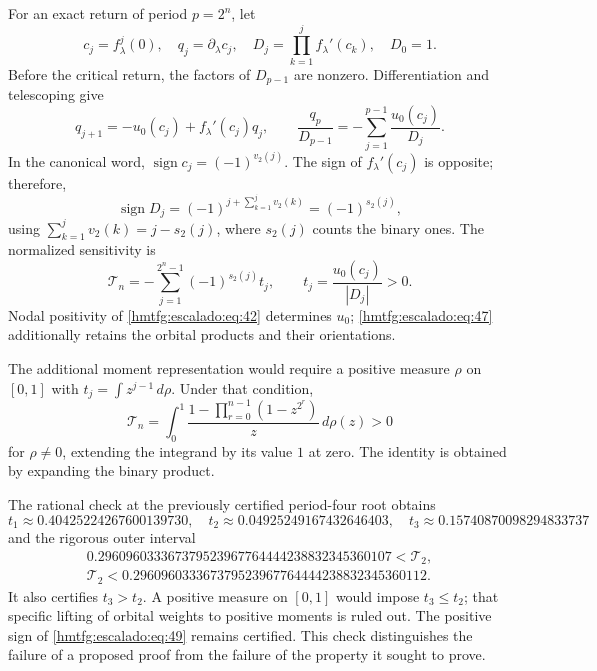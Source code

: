 For an exact return of period \(p=2^n\), let
\[
c_j=f_\lambda^j(0),\quad q_j=\partial_\lambda c_j,\quad
D_j=\prod_{k=1}^j f_\lambda'(c_k),\quad D_0=1.
\]
Before the critical return, the factors of \(D_{p-1}\) are nonzero. Differentiation and telescoping give
\begin{equation}
q_{j+1}=-u_0(c_j)+f_\lambda'(c_j)q_j,\qquad
\boxed{\frac{q_p}{D_{p-1}}
=-\sum_{j=1}^{p-1}\frac{u_0(c_j)}{D_j}.}
\label{hmtfg:escalado:eq:45}
\end{equation}
In the canonical word, \(\operatorname{sign}c_j=(-1)^{v_2(j)}\). The sign of \(f_\lambda'(c_j)\) is opposite; therefore,
\begin{equation}
\operatorname{sign}D_j=(-1)^{j+\sum_{k=1}^jv_2(k)}
=(-1)^{s_2(j)},
\label{hmtfg:escalado:eq:46}
\end{equation}
using \(\sum_{k=1}^jv_2(k)=j-s_2(j)\), where \(s_2(j)\) counts the binary ones. The normalized sensitivity is
\begin{equation}
\mathcal T_n=-\sum_{j=1}^{2^n-1}(-1)^{s_2(j)}t_j,\qquad
t_j=\frac{u_0(c_j)}{|D_j|}>0.
\label{hmtfg:escalado:eq:47}
\end{equation}
Nodal positivity of \eqref{hmtfg:escalado:eq:42} determines \(u_0\); \eqref{hmtfg:escalado:eq:47} additionally retains the orbital products and their orientations.

The additional moment representation would require a positive measure \(\rho\) on \([0,1]\) with \(t_j=\int z^{j-1}\,d\rho\). Under that condition,
\begin{equation}
\mathcal T_n=\int_0^1
\frac{1-\prod_{r=0}^{n-1}(1-z^{2^r})}{z}\,d\rho(z)>0
\label{hmtfg:escalado:eq:48}
\end{equation}
for \(\rho\ne0\), extending the integrand by its value \(1\) at zero. The identity is obtained by expanding the binary product.

The rational check at the previously certified period-four root obtains
\[
t_1\approx0.40425224267600139730,\quad
t_2\approx0.04925249167432646403,\quad
t_3\approx0.15740870098294833737
\]
and the rigorous outer interval
\begin{equation}
\begin{gathered}
0.296096033367379523967764444238832345360107<\mathcal T_2,\\
\mathcal T_2<0.296096033367379523967764444238832345360112.
\end{gathered}
\label{hmtfg:escalado:eq:49}
\end{equation}
It also certifies \(t_3>t_2\). A positive measure on \([0,1]\) would impose \(t_3\le t_2\); that specific lifting of orbital weights to positive moments is ruled out. The positive sign of \eqref{hmtfg:escalado:eq:49} remains certified. This check distinguishes the failure of a proposed proof from the failure of the property it sought to prove.
